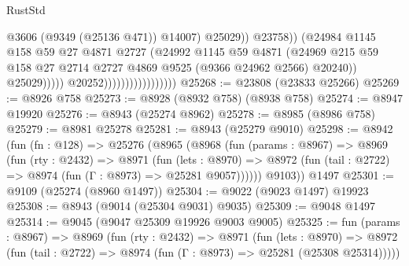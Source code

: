 \begin{lexlean}{RustStd}
\begin{coremodule}
                                                        @3606
                                                        (@9349 (@25136 @471))
                                                        @14007)
                                                      @25029))
                                                  @23758))
                                              (@24984
                                                @1145
                                                @158
                                                @59
                                                @27
                                                @4871
                                                @2727
                                                (@24992
                                                  @1145
                                                  @59
                                                  @4871
                                                  (@24969
                                                    @215
                                                    @59
                                                    @158
                                                    @27
                                                    @2714
                                                    @2727
                                                    @4869
                                                    @9525
                                                    (@9366 @24962 @2566)
                                                    @20240))
                                                @25029)))))
                                      @20252)))))))))))))))))
@25268 := @23808 (@23833 @25266)
@25269 := @8926 @758
@25273 := @8928 (@8932 @758) (@8938 @758)
@25274 := @8947 @19920
@25276 := @8943 (@25274 @8962)
@25278 := @8985 (@8986 @758)
@25279 := @8981 @25278
@25281 := @8943 (@25279 @9010)
@25298 := @8942
    (fun (fn : @128) =>
    @25276
      (@8965
        (@8968
          (fun (params : @8967) =>
          @8969
            (fun (rty : @2432) =>
            @8971
              (fun (lets : @8970) =>
              @8972 (fun (tail : @2722) => @8974 (fun (Γ : @8973) => @25281 @9057))))))
        @9103))
    @1497
@25301 := @9109 (@25274 (@8960 @1497))
@25304 := @9022 (@9023 @1497) @19923
@25308 := @8943 (@9014 (@25304 @9031) @9035)
@25309 := @9048 @1497
@25314 := @9045 (@9047 @25309 @19926 @9003 @9005)
@25325 := fun (params : @8967) =>
  @8969
    (fun (rty : @2432) =>
    @8971
      (fun (lets : @8970) =>
      @8972 (fun (tail : @2722) => @8974 (fun (Γ : @8973) => @25281 (@25308 @25314)))))

\end{coremodule}
\end{lexlean}

